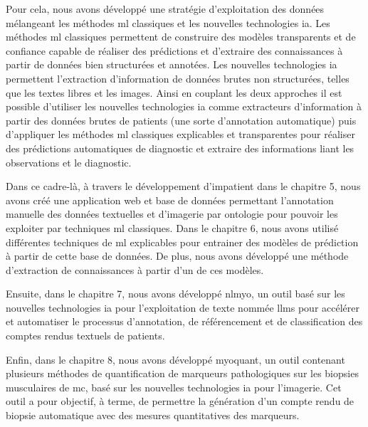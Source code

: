 Pour cela, nous avons développé une stratégie d'exploitation des données mélangeant les méthodes \gls{ml} classiques et les nouvelles technologies \gls{ia}. Les méthodes \gls{ml} classiques permettent de construire des modèles transparents et de confiance capable de réaliser des prédictions et d'extraire des connaissances à partir de données bien structurées et annotées. Les nouvelles technologies \gls{ia} permettent l'extraction d'information de données brutes non structurées, telles que les textes libres et les images. Ainsi en couplant les deux approches il est possible d'utiliser les nouvelles technologies \gls{ia} comme extracteurs d'information à partir des données brutes de patients (une sorte d'annotation automatique) puis d'appliquer les méthodes \gls{ml} classiques explicables et transparentes pour réaliser des prédictions automatiques de diagnostic et extraire des informations liant les observations et le diagnostic.

Dans ce cadre-là, à travers le développement d'\gls{impatient} dans le chapitre 5, nous avons créé une application web et base de données permettant l'annotation manuelle des données textuelles et d'imagerie par ontologie pour pouvoir les exploiter par techniques \gls{ml} classiques. Dans le chapitre 6, nous avons utilisé différentes techniques de \gls{ml} explicables pour entrainer des modèles de prédiction à partir de cette base de données. De plus, nous avons développé une méthode d'extraction de connaissances à partir d'un de ces modèles. 

Ensuite, dans le chapitre 7, nous avons développé \gls{nlmyo}, un outil basé sur les nouvelles technologies \gls{ia} pour l'exploitation de texte nommée \gls{llms} pour accélérer et automatiser le processus d'annotation, de référencement et de classification des comptes rendus textuels de patients.

Enfin, dans le chapitre 8, nous avons développé \gls{myoquant}, un outil contenant plusieurs méthodes de quantification de marqueurs pathologiques sur les biopsies musculaires de \gls{mc}, basé sur les nouvelles technologies \gls{ia} pour l'imagerie. Cet outil a pour objectif, à terme, de permettre la génération d'un compte rendu de biopsie automatique avec des mesures quantitatives des marqueurs.